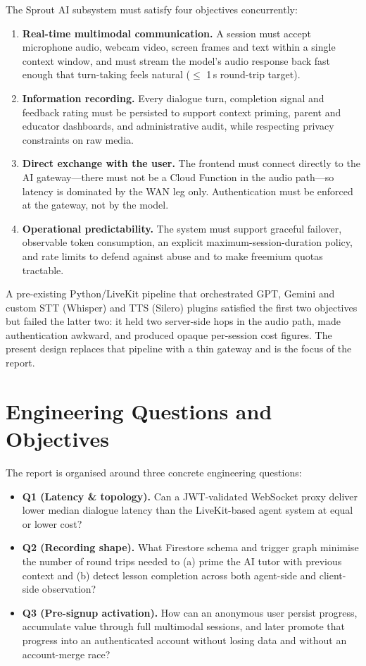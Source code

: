 The Sprout AI subsystem must satisfy four objectives concurrently:
\begin{enumerate}
    \item \textbf{Real-time multimodal communication.} A session must accept microphone audio, webcam video, screen frames and text within a single context window, and must stream the model's audio response back fast enough that turn-taking feels natural ($\leq$ 1\,s round-trip target).
    \item \textbf{Information recording.} Every dialogue turn, completion signal and feedback rating must be persisted to support context priming, parent and educator dashboards, and administrative audit, while respecting privacy constraints on raw media.
    \item \textbf{Direct exchange with the user.} The frontend must connect directly to the AI gateway---there must not be a Cloud Function in the audio path---so latency is dominated by the WAN leg only. Authentication must be enforced at the gateway, not by the model.
    \item \textbf{Operational predictability.} The system must support graceful failover, observable token consumption, an explicit maximum-session-duration policy, and rate limits to defend against abuse and to make freemium quotas tractable.
\end{enumerate}

A pre-existing Python/LiveKit pipeline that orchestrated GPT, Gemini and custom STT (Whisper) and TTS (Silero) plugins satisfied the first two objectives but failed the latter two: it held two server-side hops in the audio path, made authentication awkward, and produced opaque per-session cost figures. The present design replaces that pipeline with a thin gateway and is the focus of the report.

\section{Engineering Questions and Objectives}
\label{sec:questions}

The report is organised around three concrete engineering questions:
\begin{itemize}
    \item \textbf{Q1 (Latency \& topology).} Can a JWT-validated WebSocket proxy deliver lower median dialogue latency than the LiveKit-based agent system at equal or lower cost?
    \item \textbf{Q2 (Recording shape).} What Firestore schema and trigger graph minimise the number of round trips needed to (a) prime the AI tutor with previous context and (b) detect lesson completion across both agent-side and client-side observation?
    \item \textbf{Q3 (Pre-signup activation).} How can an anonymous user persist progress, accumulate value through full multimodal sessions, and later promote that progress into an authenticated account without losing data and without an account-merge race?
\end{itemize}

